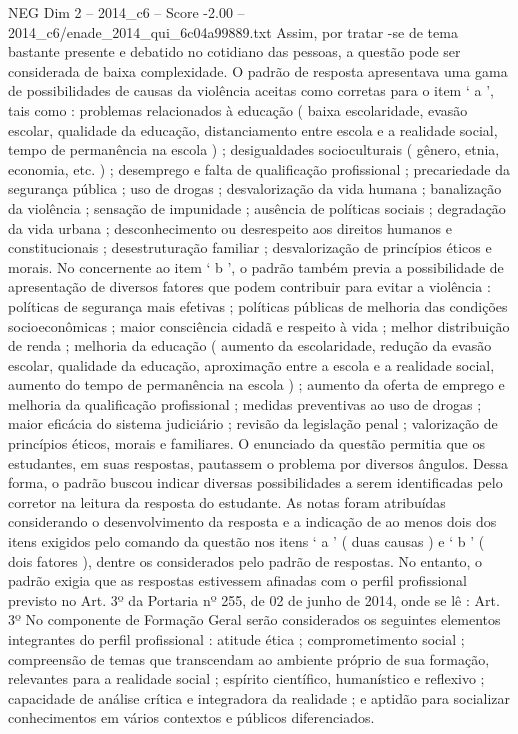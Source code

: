 \begin{textsample}{NEG Dim 2 – 2014\_c6 – Score -2.00 – 2014\_c6/enade\_2014\_qui\_6c04a99889.txt}
Assim, por tratar -se de tema bastante presente e debatido no cotidiano das pessoas, a questão pode ser considerada de baixa complexidade.
O padrão de resposta apresentava uma gama de possibilidades de causas da violência aceitas como corretas para o item ‘ a ’, tais como : problemas relacionados à educação ( baixa escolaridade, evasão escolar, qualidade da educação, distanciamento entre escola e a realidade social, tempo de permanência na escola ) ; desigualdades socioculturais ( gênero, etnia, economia, etc. ) ; desemprego e falta de qualificação profissional ; precariedade da segurança pública ; uso de drogas ; desvalorização da vida humana ; banalização da violência ; sensação de impunidade ; ausência de políticas sociais ; degradação da vida urbana ; desconhecimento ou desrespeito aos direitos humanos e constitucionais ; desestruturação familiar ; desvalorização de princípios éticos e morais.
No concernente ao item ‘ b ’, o padrão também previa a possibilidade de apresentação de diversos fatores que podem contribuir para evitar a violência : políticas de segurança mais efetivas ; políticas públicas de melhoria das condições socioeconômicas ; maior consciência cidadã e respeito à vida ; melhor distribuição de renda ; melhoria da educação ( aumento da escolaridade, redução da evasão escolar, qualidade da educação, aproximação entre a escola e a realidade social, aumento do tempo de permanência na escola ) ; aumento da oferta de emprego e melhoria da qualificação profissional ; medidas preventivas ao uso de drogas ; maior eficácia do sistema judiciário ; revisão da legislação penal ; valorização de princípios éticos, morais e familiares.
O enunciado da questão permitia que os estudantes, em suas respostas, pautassem o problema por diversos ângulos.
Dessa forma, o padrão buscou indicar diversas possibilidades a serem identificadas pelo corretor na leitura da resposta do estudante.
As notas foram atribuídas considerando o desenvolvimento da resposta e a indicação de ao menos dois dos itens exigidos pelo comando da questão nos itens ‘ a ’ ( duas causas ) e ‘ b ’ ( dois fatores ), dentre os considerados pelo padrão de respostas.
No entanto, o padrão exigia que as respostas estivessem afinadas com o perfil profissional previsto no Art. 3º da Portaria nº 255, de 02 de junho de 2014, onde se lê : Art. 3º No componente de Formação Geral serão considerados os seguintes elementos integrantes do perfil profissional : atitude ética ; comprometimento social ; compreensão de temas que transcendam ao ambiente próprio de sua formação, relevantes para a realidade social ; espírito científico, humanístico e reflexivo ; capacidade de análise crítica e integradora da realidade ; e aptidão para socializar conhecimentos em vários contextos e públicos diferenciados.

\end{textsample}
